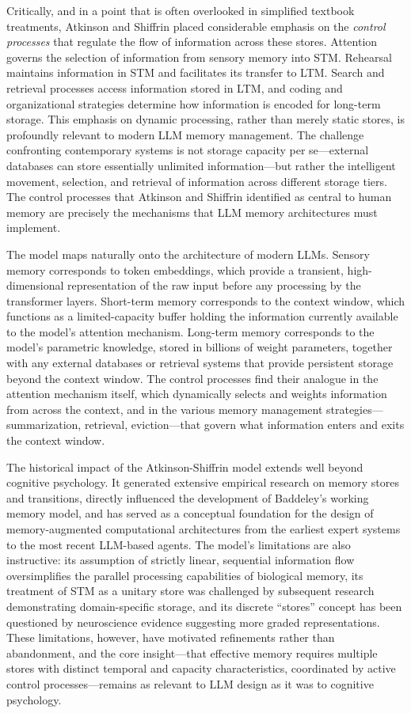 Critically, and in a point that is often overlooked in simplified textbook treatments, Atkinson and Shiffrin placed considerable emphasis on the \emph{control processes} that regulate the flow of information across these stores. Attention governs the selection of information from sensory memory into STM. Rehearsal maintains information in STM and facilitates its transfer to LTM. Search and retrieval processes access information stored in LTM, and coding and organizational strategies determine how information is encoded for long-term storage. This emphasis on dynamic processing, rather than merely static stores, is profoundly relevant to modern LLM memory management. The challenge confronting contemporary systems is not storage capacity per se---external databases can store essentially unlimited information---but rather the intelligent movement, selection, and retrieval of information across different storage tiers. The control processes that Atkinson and Shiffrin identified as central to human memory are precisely the mechanisms that LLM memory architectures must implement.

The model maps naturally onto the architecture of modern LLMs. Sensory memory corresponds to token embeddings, which provide a transient, high-dimensional representation of the raw input before any processing by the transformer layers. Short-term memory corresponds to the context window, which functions as a limited-capacity buffer holding the information currently available to the model's attention mechanism. Long-term memory corresponds to the model's parametric knowledge, stored in billions of weight parameters, together with any external databases or retrieval systems that provide persistent storage beyond the context window. The control processes find their analogue in the attention mechanism itself, which dynamically selects and weights information from across the context, and in the various memory management strategies---summarization, retrieval, eviction---that govern what information enters and exits the context window.

The historical impact of the Atkinson-Shiffrin model extends well beyond cognitive psychology. It generated extensive empirical research on memory stores and transitions, directly influenced the development of Baddeley's working memory model, and has served as a conceptual foundation for the design of memory-augmented computational architectures from the earliest expert systems to the most recent LLM-based agents. The model's limitations are also instructive: its assumption of strictly linear, sequential information flow oversimplifies the parallel processing capabilities of biological memory, its treatment of STM as a unitary store was challenged by subsequent research demonstrating domain-specific storage, and its discrete ``stores'' concept has been questioned by neuroscience evidence suggesting more graded representations. These limitations, however, have motivated refinements rather than abandonment, and the core insight---that effective memory requires multiple stores with distinct temporal and capacity characteristics, coordinated by active control processes---remains as relevant to LLM design as it was to cognitive psychology.

